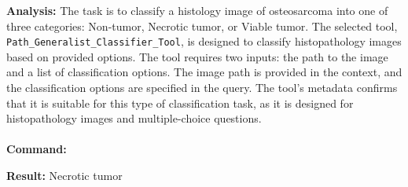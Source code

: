 \begin{executorbox}

\textbf{Analysis:}
The task is to classify a histology image of osteosarcoma into one of three categories: Non-tumor, Necrotic tumor, or Viable tumor. The selected tool, \texttt{Path\_Generalist\_Classifier\_Tool}, is designed to classify histopathology images based on provided options. The tool requires two inputs: the path to the image and a list of classification options. The image path is provided in the context, and the classification options are specified in the query. The tool's metadata confirms that it is suitable for this type of classification task, as it is designed for histopathology images and multiple-choice questions.
\\\\
\textbf{Command:}
\end{executorbox}


\begin{executorbox}
\textbf{Result:}
Necrotic tumor
\end{executorbox}


